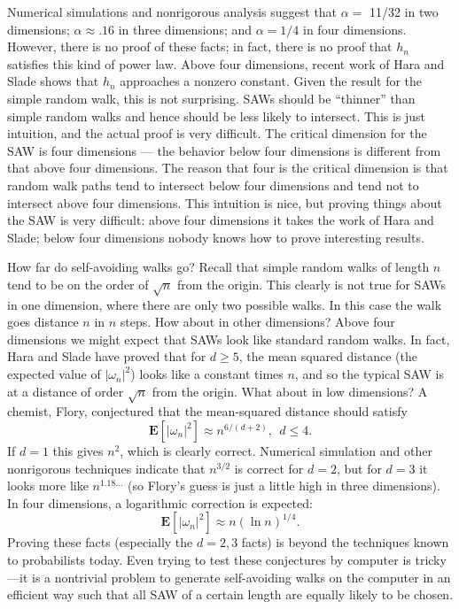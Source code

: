 \documentclass{stml-l}
\theoremstyle{definition}
\numberwithin{equation}{chapter}
\numberwithin{figure}{chapter}
\numberwithin{figure}{section}
\begin{document}
Numerical simulations and nonrigorous analysis suggest that
$\alpha=$ 11/32 in two dimensions; $\alpha\approx.16$ in three
dimensions; and $\alpha=1/4$ in four dimensions. However, there is
no proof of these facts; in fact, there is no proof that $h_{n}$
satisfies this kind of power law. Above four dimensions, recent work
of Hara and Slade shows that $h_{n}$ approaches a nonzero constant.
Given the result for the simple random walk, this is not surprising.
SAWs should be ``thinner'' than simple random walks and hence should
be less likely to intersect. This is just intuition, and the actual
proof is very difficult. The critical dimension for the SAW is four
dimensions --- the behavior below four dimensions is different from
that above four dimensions. The reason that four is the critical
dimension is that random walk paths tend to intersect below four
dimensions and tend not to intersect above four dimensions. This
intuition is nice, but proving things about the SAW is very
difficult: above four dimensions it takes the work of Hara and
Slade; below four dimensions nobody knows how to prove interesting
results.

How far do self-avoiding walks go? Recall that simple random walks
of length $n$ tend to be on the order of $\sqrt{n}$ from the origin.
This clearly is not true for SAWs in one dimension, where there are
only two possible walks. In this case the walk goes distance $n$ in
$n$ steps. How about in other dimensions? Above four dimensions we
might expect that SAWs look like standard random walks. In fact,
Hara and Slade have proved that for $d\geq 5$, the mean squared
distance (the expected value of $|\omega_{n}|^{2}$) looks like a
constant times $n$, and so the typical SAW is at a distance of order
$\sqrt{n}$ from the origin. What about in low dimensions? A chemist,
Flory, conjectured that the mean-squared distance should satisfy
\begin{equation*}
\mathbf{E}[|\omega_{n}|^{2}]\approx n^{6/(d+2)},\ \ d\leq 4.
\end{equation*}
If $d=1$ this gives $n^{2}$, which is clearly correct. Numerical
simulation and other nonrigorous techniques indicate that $n^{3/2}$
is correct for $d=2$, but for $d=3$ it looks more like $n^{1.18\ldots}$ (so Flory's guess is just a little high in three
dimensions). In four dimensions, a logarithmic correction is
expected:
\begin{equation*}
\mathbf{E}[|\omega_{n}|^{2}]\approx n(\ln n)^{1/4}.
\end{equation*}
Proving these facts (especially the $d=2,3$ facts) is beyond the
techniques known to probabilists today. Even trying to test these
conjectures by computer is tricky---it is a nontrivial problem to
generate self-avoiding walks on the computer in an efficient way
such that all SAW of a certain length are equally likely to be
chosen.
\end{document}
